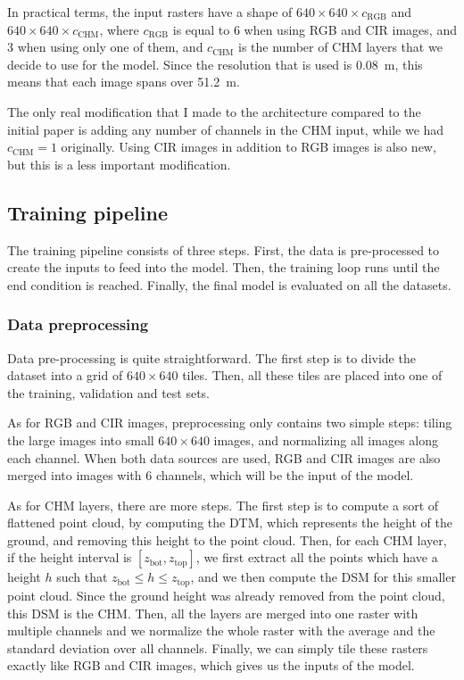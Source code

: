\documentclass[
  letterpaper,
  DIV=11,
  numbers=noendperiod]{scrartcl}
\begin{document}
In practical terms, the input rasters have a shape of
\(640 \times 640 \times c_{\text{RGB}}\) and
\(640 \times 640 \times c_{\text{CHM}}\), where \(c_{\text{RGB}}\) is
equal to 6 when using RGB and CIR images, and 3 when using only one of
them, and \(c_{\text{CHM}}\) is the number of CHM layers that we decide
to use for the model. Since the resolution that is used is 0.08~m, this
means that each image spans over 51.2~m.

The only real modification that I made to the architecture compared to
the initial paper is adding any number of channels in the CHM input,
while we had \(c_{\text{CHM}} = 1\) originally. Using CIR images in
addition to RGB images is also new, but this is a less important
modification.

\subsection{Training pipeline}\label{training-pipeline}

The training pipeline consists of three steps. First, the data is
pre-processed to create the inputs to feed into the model. Then, the
training loop runs until the end condition is reached. Finally, the
final model is evaluated on all the datasets.

\subsubsection{Data preprocessing}\label{data-preprocessing}

Data pre-processing is quite straightforward. The first step is to
divide the dataset into a grid of \(640 \times 640\) tiles. Then, all
these tiles are placed into one of the training, validation and test
sets.

As for RGB and CIR images, preprocessing only contains two simple steps:
tiling the large images into small \(640 \times 640\) images, and
normalizing all images along each channel. When both data sources are
used, RGB and CIR images are also merged into images with 6 channels,
which will be the input of the model.

As for CHM layers, there are more steps. The first step is to compute a
sort of flattened point cloud, by computing the DTM, which represents
the height of the ground, and removing this height to the point cloud.
Then, for each CHM layer, if the height interval is
\([z_\text{bot}, z_\text{top}]\), we first extract all the points which
have a height \(h\) such that \(z_\text{bot} \leq h \leq z_\text{top}\),
and we then compute the DSM for this smaller point cloud. Since the
ground height was already removed from the point cloud, this DSM is the
CHM. Then, all the layers are merged into one raster with multiple
channels and we normalize the whole raster with the average and the
standard deviation over all channels. Finally, we can simply tile these
rasters exactly like RGB and CIR images, which gives us the inputs of
the model.
\end{document}
